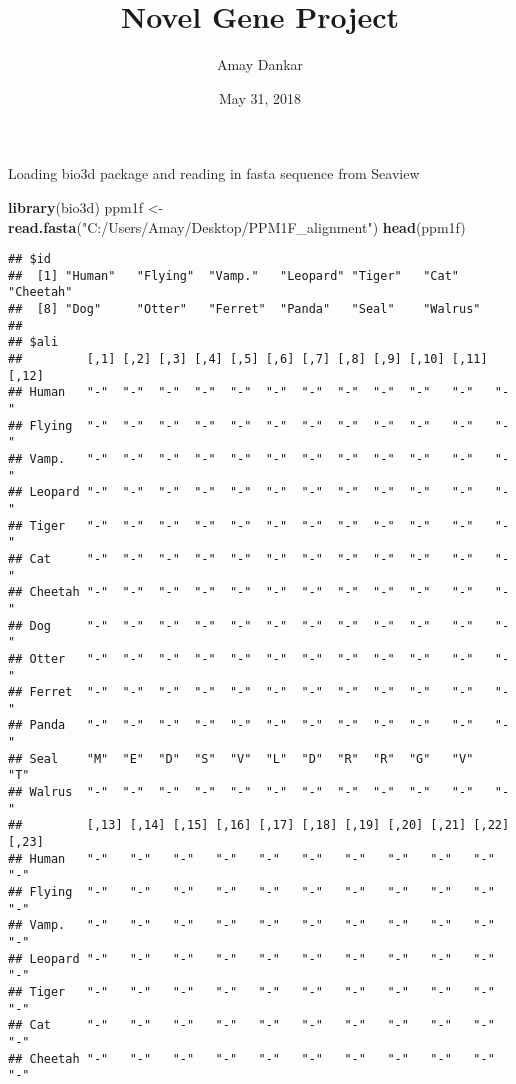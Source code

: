 \documentclass[]{article}
\title{Novel Gene Project}
\author{Amay Dankar}
\date{May 31, 2018}
\newenvironment{Shaded}{\begin{snugshade}}{\end{snugshade}}
\newcommand{\KeywordTok}[1]{\textcolor[rgb]{0.13,0.29,0.53}{\textbf{#1}}}
\newcommand{\StringTok}[1]{\textcolor[rgb]{0.31,0.60,0.02}{#1}}
\newcommand{\NormalTok}[1]{#1}
\begin{document}
\maketitle

Loading bio3d package and reading in fasta sequence from Seaview

\begin{Shaded}
\begin{Highlighting}[]
\KeywordTok{library}\NormalTok{(bio3d)}
\NormalTok{ppm1f <-}\StringTok{ }\KeywordTok{read.fasta}\NormalTok{(}\StringTok{"C:/Users/Amay/Desktop/PPM1F_alignment"}\NormalTok{)}
\KeywordTok{head}\NormalTok{(ppm1f)}
\end{Highlighting}
\end{Shaded}

\begin{verbatim}
## $id
##  [1] "Human"   "Flying"  "Vamp."   "Leopard" "Tiger"   "Cat"     "Cheetah"
##  [8] "Dog"     "Otter"   "Ferret"  "Panda"   "Seal"    "Walrus" 
## 
## $ali
##         [,1] [,2] [,3] [,4] [,5] [,6] [,7] [,8] [,9] [,10] [,11] [,12]
## Human   "-"  "-"  "-"  "-"  "-"  "-"  "-"  "-"  "-"  "-"   "-"   "-"  
## Flying  "-"  "-"  "-"  "-"  "-"  "-"  "-"  "-"  "-"  "-"   "-"   "-"  
## Vamp.   "-"  "-"  "-"  "-"  "-"  "-"  "-"  "-"  "-"  "-"   "-"   "-"  
## Leopard "-"  "-"  "-"  "-"  "-"  "-"  "-"  "-"  "-"  "-"   "-"   "-"  
## Tiger   "-"  "-"  "-"  "-"  "-"  "-"  "-"  "-"  "-"  "-"   "-"   "-"  
## Cat     "-"  "-"  "-"  "-"  "-"  "-"  "-"  "-"  "-"  "-"   "-"   "-"  
## Cheetah "-"  "-"  "-"  "-"  "-"  "-"  "-"  "-"  "-"  "-"   "-"   "-"  
## Dog     "-"  "-"  "-"  "-"  "-"  "-"  "-"  "-"  "-"  "-"   "-"   "-"  
## Otter   "-"  "-"  "-"  "-"  "-"  "-"  "-"  "-"  "-"  "-"   "-"   "-"  
## Ferret  "-"  "-"  "-"  "-"  "-"  "-"  "-"  "-"  "-"  "-"   "-"   "-"  
## Panda   "-"  "-"  "-"  "-"  "-"  "-"  "-"  "-"  "-"  "-"   "-"   "-"  
## Seal    "M"  "E"  "D"  "S"  "V"  "L"  "D"  "R"  "R"  "G"   "V"   "T"  
## Walrus  "-"  "-"  "-"  "-"  "-"  "-"  "-"  "-"  "-"  "-"   "-"   "-"  
##         [,13] [,14] [,15] [,16] [,17] [,18] [,19] [,20] [,21] [,22] [,23]
## Human   "-"   "-"   "-"   "-"   "-"   "-"   "-"   "-"   "-"   "-"   "-"  
## Flying  "-"   "-"   "-"   "-"   "-"   "-"   "-"   "-"   "-"   "-"   "-"  
## Vamp.   "-"   "-"   "-"   "-"   "-"   "-"   "-"   "-"   "-"   "-"   "-"  
## Leopard "-"   "-"   "-"   "-"   "-"   "-"   "-"   "-"   "-"   "-"   "-"  
## Tiger   "-"   "-"   "-"   "-"   "-"   "-"   "-"   "-"   "-"   "-"   "-"  
## Cat     "-"   "-"   "-"   "-"   "-"   "-"   "-"   "-"   "-"   "-"   "-"  
## Cheetah "-"   "-"   "-"   "-"   "-"   "-"   "-"   "-"   "-"   "-"   "-"  

\end{verbatim}
\end{document}
